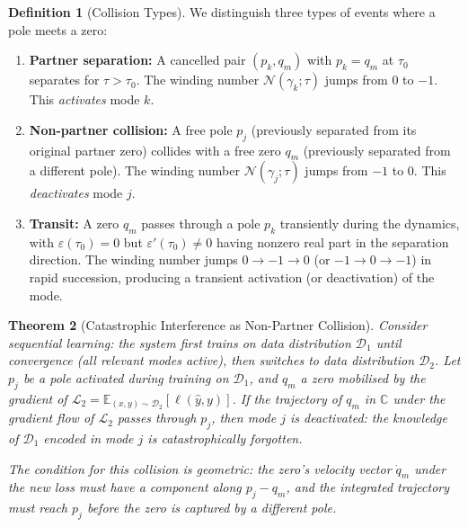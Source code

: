 \documentclass[11pt,a4paper]{article}
\newtheorem{theorem}{Theorem}[section]
\theoremstyle{definition}
\newtheorem{definition}[theorem]{Definition}
\newcommand{\C}{\mathbb{C}}
\newcommand{\E}{\mathbb{E}}
\newcommand{\cL}{\mathcal{L}}
\newcommand{\cD}{\mathcal{D}}
\newcommand{\cN}{\mathcal{N}}
\newcommand{\eps}{\varepsilon}
\begin{document}
\begin{definition}[Collision Types]\label{def:collision_types}
We distinguish three types of events where a pole meets a zero:
\begin{enumerate}[label=(\roman*)]
  \item \textbf{Partner separation:} A cancelled pair
    $(p_k, q_m)$ with $p_k = q_m$ at $\tau_0$ separates for
    $\tau > \tau_0$. The winding number
    $\cN(\gamma_k;\tau)$ jumps from $0$ to $-1$.
    This \emph{activates} mode $k$.
  \item \textbf{Non-partner collision:} A free pole $p_j$
    (previously separated from its original partner zero)
    collides with a free zero $q_m$ (previously separated from
    a different pole). The winding number
    $\cN(\gamma_j;\tau)$ jumps from $-1$ to $0$.
    This \emph{deactivates} mode $j$.
  \item \textbf{Transit:} A zero $q_m$ passes through a pole
    $p_k$ transiently during the dynamics, with
    $\eps(\tau_0) = 0$ but $\eps'(\tau_0) \neq 0$ having
    nonzero real part in the separation direction. The winding
    number jumps $0 \to -1 \to 0$ (or $-1 \to 0 \to -1$) in
    rapid succession, producing a transient activation
    (or deactivation) of the mode.
\end{enumerate}
\end{definition}

\begin{theorem}[Catastrophic Interference as Non-Partner Collision]%
\label{thm:catastrophic}
Consider sequential learning: the system first trains on data
distribution $\cD_1$ until convergence (all relevant modes
active), then switches to data distribution $\cD_2$.
Let $p_j$ be a pole activated during training on $\cD_1$,
and $q_m$ a zero mobilised by the gradient of
$\cL_2 = \E_{(x,y)\sim\cD_2}[\ell(\hat{y}, y)]$.
If the trajectory of $q_m$ in $\C$ under the gradient flow of
$\cL_2$ passes through $p_j$, then mode $j$ is deactivated:
the knowledge of $\cD_1$ encoded in mode $j$ is catastrophically
forgotten.

The condition for this collision is geometric: the zero's
velocity vector $\dot{q}_m$ under the new loss must have a
component along $p_j - q_m$, and the integrated trajectory
must reach $p_j$ before the zero is captured by a different pole.
\end{theorem}
\end{document}
